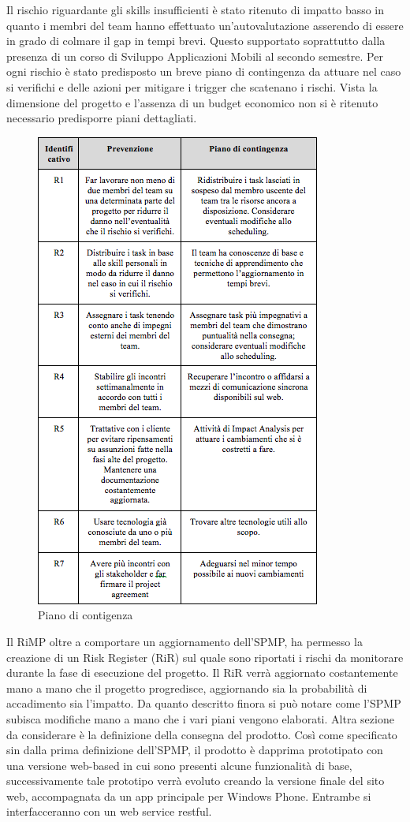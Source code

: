 Il rischio riguardante gli skills insufficienti \`{e} stato ritenuto di impatto basso in quanto i membri del team hanno effettuato un\rq autovalutazione asserendo di essere in grado di colmare il gap in tempi brevi. Questo supportato soprattutto dalla presenza di un corso di Sviluppo Applicazioni Mobili al secondo semestre.
Per ogni rischio \`{e} stato predisposto un breve piano di contingenza da attuare nel caso si verifichi e delle azioni per mitigare i trigger che scatenano i rischi. Vista la dimensione del progetto e l\rq assenza di un budget economico non si \`{e} ritenuto necessario predisporre piani dettagliati.
\begin{figure}[h]
\centering
\includegraphics[scale=.6]{img/18.png}
\caption{Piano di contigenza}
\label{fig:cd}
\end{figure}
Il RiMP oltre a comportare un aggiornamento dell\rq SPMP, ha permesso la creazione di un Risk Register (RiR) sul quale sono riportati i rischi da monitorare durante la fase di esecuzione del progetto.
Il RiR verr\`{a} aggiornato costantemente mano a mano che il progetto progredisce, aggiornando sia la probabilit\`{a} di accadimento sia l\rq impatto.
Da quanto descritto finora si pu\`{o} notare come l\rq SPMP subisca modifiche mano a mano che i vari piani vengono elaborati. Altra sezione da considerare \`{e} la definizione della consegna del prodotto. Cos\`{i} come specificato sin dalla prima definizione dell\rq SPMP, il prodotto \`{e} dapprima prototipato con una versione web-based in cui sono presenti alcune funzionalit\`{a} di base, successivamente tale prototipo verr\`{a} evoluto creando la versione finale del sito web, accompagnata da un app principale per Windows Phone. Entrambe si interfacceranno con un web service restful.

